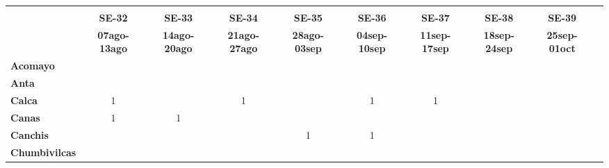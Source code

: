 \begin{tabular}{lccccccccc}
	\textbf{}              	  
	& \multicolumn{1}{l}{}                        
	& \multicolumn{1}{l}{}      
	& \multicolumn{1}{l}{}                         
	& \multicolumn{1}{l}{}                         
	& \multicolumn{1}{l}{}                         
	& \multicolumn{1}{l}{}                        
	& \multicolumn{1}{l}{}                         
	& \multicolumn{1}{l}{} \\                   
	\textbf{}                                                                 				
	&\textbf{SE-32}						
	&\textbf{SE-33}								
	&\textbf{SE-34}					
	&\textbf{SE-35}								
	&\textbf{SE-36}
	&\textbf{SE-37}
	&\textbf{SE-38}
	&\textbf{SE-39}\\							
	\textbf{}              	  																
	&\textbf{07ago-13ago}						
	&\textbf{14ago-20ago}						
	&\textbf{21ago-27ago}						
	&\textbf{28ago-03sep}
	&\textbf{04sep-10sep}
	&\textbf{11sep-17sep} 
	&\textbf{18sep-24sep} 
	&\textbf{25sep-01oct}\\
	\textbf{Acomayo}                        												
	&\cellcolor[HTML]{FCC46C}
	&\cellcolor[HTML]{FCC46C}					
	&\cellcolor[HTML]{FCC46C}
	&\cellcolor[HTML]{FCC46C}					
	&\cellcolor[HTML]{FCC46C}
	&\cellcolor[HTML]{FCC46C} 
	&\cellcolor[HTML]{FCC46C}
	&\cellcolor[HTML]{FCC46C}\\
	\textbf{Anta}                                                  							&\cellcolor[HTML]{FCC46C}						
	&\cellcolor[HTML]{FCC46C}					
	&\cellcolor[HTML]{FCC46C}					
	&\cellcolor[HTML]{FCC46C}					
	&\cellcolor[HTML]{FCC46C}
	&\cellcolor[HTML]{FCC46C}	
	&\cellcolor[HTML]{FCC46C}
	&\cellcolor[HTML]{FCC46C}\\					
	\textbf{Calca}      				       											
	&1											
	&\cellcolor[HTML]{FCC46C}					
	&1											
	&\cellcolor[HTML]{FCC46C}
	&1
	&1
	&\cellcolor[HTML]{FCC46C}
	&\cellcolor[HTML]{FCC46C}\\          			
	\textbf{Canas}                              									
	&1											
	&1
	&\cellcolor[HTML]{FCC46C}					
	&\cellcolor[HTML]{FCC46C}
	&\cellcolor[HTML]{FCC46C}	
	&\cellcolor[HTML]{FCC46C}
	&\cellcolor[HTML]{FCC46C}
	&\cellcolor[HTML]{FCC46C}\\	
	\textbf{Canchis}   	
	&\cellcolor[HTML]{FCC46C}					
	&\cellcolor[HTML]{FCC46C}			
	&\cellcolor[HTML]{FCC46C}					
	&1
	&1
	&\cellcolor[HTML]{FCC46C}
	&\cellcolor[HTML]{FCC46C}
	&\cellcolor[HTML]{FCC46C}\\											
	\textbf{Chumbivilcas}                      									

\end{tabular}
